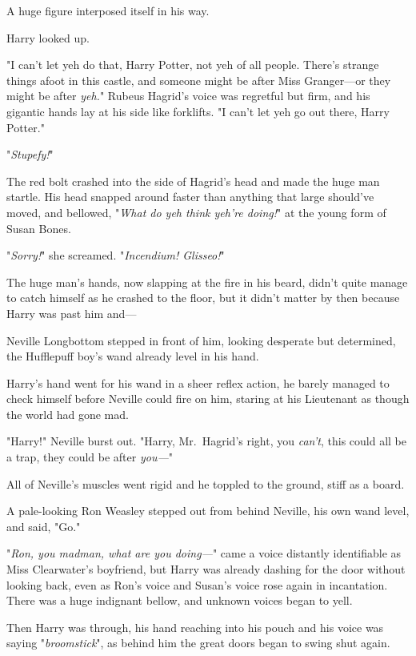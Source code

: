 A huge figure interposed itself in his way.

Harry looked up.

"I can't let yeh do that, Harry Potter, not yeh of all people. There's strange 
things afoot in this castle, and someone might be after Miss Granger---or they 
might be after \emph{yeh.}" Rubeus Hagrid's voice was regretful but firm, and 
his gigantic hands lay at his side like forklifts. "I can't let yeh go out 
there, Harry Potter."

"\emph{Stupefy!}"

The red bolt crashed into the side of Hagrid's head and made the huge man 
startle. His head snapped around faster than anything that large should've 
moved, and bellowed, "\emph{What do yeh think yeh're doing!}" at the young form 
of Susan Bones.

"\emph{Sorry!}" she screamed. "\emph{Incendium! Glisseo!}"

The huge man's hands, now slapping at the fire in his beard, didn't quite 
manage to catch himself as he crashed to the floor, but it didn't matter by 
then because Harry was past him and---

Neville Longbottom stepped in front of him, looking desperate but determined, 
the Hufflepuff boy's wand already level in his hand.

Harry's hand went for his wand in a sheer reflex action, he barely managed to 
check himself before Neville could fire on him, staring at his Lieutenant as 
though the world had gone mad.

"Harry!" Neville burst out. "Harry, Mr.~Hagrid's right, you \emph{can't}, this 
could all be a trap, they could be after \emph{you---}"

All of Neville's muscles went rigid and he toppled to the ground, stiff as a 
board.

A pale-looking Ron Weasley stepped out from behind Neville, his own wand level, 
and said, "Go."

"\emph{Ron, you madman, what are you doing---}" came a voice distantly 
identifiable as Miss Clearwater's boyfriend, but Harry was already dashing for 
the door without looking back, even as Ron's voice and Susan's voice rose again 
in incantation. There was a huge indignant bellow, and unknown voices began to 
yell.

Then Harry was through, his hand reaching into his pouch and his voice was 
saying "\emph{broomstick}", as behind him the great doors began to swing shut 
again.

